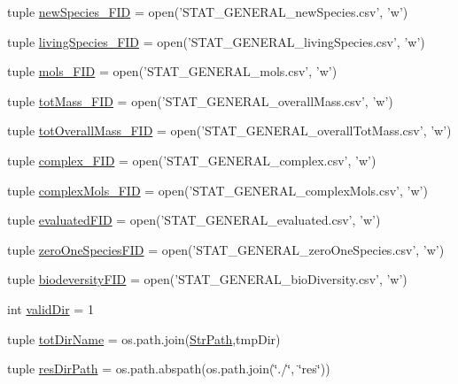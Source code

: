 \begin{DoxyCompactItemize}
\item 
tuple \hyperlink{a00098_abdb6e583333cc08cac8c63631db80b5b}{new\-Species\-\_\-\-F\-I\-D} = open('S\-T\-A\-T\-\_\-\-G\-E\-N\-E\-R\-A\-L\-\_\-new\-Species.\-csv', 'w')
\item 
tuple \hyperlink{a00098_ab7bbe9440116d34c9a373c40fc59bb3d}{living\-Species\-\_\-\-F\-I\-D} = open('S\-T\-A\-T\-\_\-\-G\-E\-N\-E\-R\-A\-L\-\_\-living\-Species.\-csv', 'w')
\item 
tuple \hyperlink{a00098_a603a41889d8732146d44da83ffaf0489}{mols\-\_\-\-F\-I\-D} = open('S\-T\-A\-T\-\_\-\-G\-E\-N\-E\-R\-A\-L\-\_\-mols.\-csv', 'w')
\item 
tuple \hyperlink{a00098_a1b7f5672822b59c7284cd2b703aacbc2}{tot\-Mass\-\_\-\-F\-I\-D} = open('S\-T\-A\-T\-\_\-\-G\-E\-N\-E\-R\-A\-L\-\_\-overall\-Mass.\-csv', 'w')
\item 
tuple \hyperlink{a00098_a20a06acdb6e82bcaab87d2781d3555a9}{tot\-Overall\-Mass\-\_\-\-F\-I\-D} = open('S\-T\-A\-T\-\_\-\-G\-E\-N\-E\-R\-A\-L\-\_\-overall\-Tot\-Mass.\-csv', 'w')
\item 
tuple \hyperlink{a00098_ace41560d233dff88c3073be734bae944}{complex\-\_\-\-F\-I\-D} = open('S\-T\-A\-T\-\_\-\-G\-E\-N\-E\-R\-A\-L\-\_\-complex.\-csv', 'w')
\item 
tuple \hyperlink{a00098_a2ef28958c50aabe7867b32f8dd6f4ace}{complex\-Mols\-\_\-\-F\-I\-D} = open('S\-T\-A\-T\-\_\-\-G\-E\-N\-E\-R\-A\-L\-\_\-complex\-Mols.\-csv', 'w')
\item 
tuple \hyperlink{a00098_a2cc9b964c81489c25978be53ab38eb16}{evaluated\-F\-I\-D} = open('S\-T\-A\-T\-\_\-\-G\-E\-N\-E\-R\-A\-L\-\_\-evaluated.\-csv', 'w')
\item 
tuple \hyperlink{a00098_a3dc90aca8a97c5995b013887c98d8ce9}{zero\-One\-Species\-F\-I\-D} = open('S\-T\-A\-T\-\_\-\-G\-E\-N\-E\-R\-A\-L\-\_\-zero\-One\-Species.\-csv', 'w')
\item 
tuple \hyperlink{a00098_a68c23cb79e89d9e14acf9ed09f46f0e4}{biodeversity\-F\-I\-D} = open('S\-T\-A\-T\-\_\-\-G\-E\-N\-E\-R\-A\-L\-\_\-bio\-Diversity.\-csv', 'w')
\item 
int \hyperlink{a00098_aebb18ab2b73e7e2705ee42c728c0a72b}{valid\-Dir} = 1
\item 
tuple \hyperlink{a00098_af4bd99f6cdaec32f48ed0074208b4f0c}{tot\-Dir\-Name} = os.\-path.\-join(\hyperlink{a00098_ac34f3f43f888eb6620266d78ce928ceb}{Str\-Path},tmp\-Dir)
\item 
tuple \hyperlink{a00098_ab3da7da39258338965b6eef645a913ee}{res\-Dir\-Path} = os.\-path.\-abspath(os.\-path.\-join(\char`\"{}./\char`\"{}, \char`\"{}res\char`\"{}))

\end{DoxyCompactItemize}
